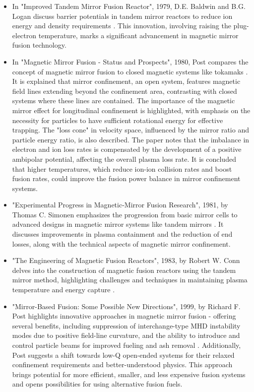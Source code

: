 \begin{itemize}
 \item In "Improved Tandem Mirror Fusion Reactor", 1979, D.E. Baldwin and B.G. Logan discuss barrier potentials in tandem mirror reactors to reduce ion energy and density requirements \cite{baldwin1979improved}. This innovation, involving raising the plug-electron temperature, marks a significant advancement in magnetic mirror fusion technology.

 \item In "Magnetic Mirror Fusion - Status and Prospects", 1980, Post compares the concept of magnetic mirror fusion to closed magnetic systems like tokamaks \cite{post1980magnetic}. It is explained that mirror confinement, an open system, features magnetic field lines extending beyond the confinement area, contrasting with closed systems where these lines are contained. The importance of the magnetic mirror effect for longitudinal confinement is highlighted, with emphasis on the necessity for particles to have sufficient rotational energy for effective trapping. The "loss cone" in velocity space, influenced by the mirror ratio and particle energy ratio, is also described. The paper notes that the imbalance in electron and ion loss rates is compensated by the development of a positive ambipolar potential, affecting the overall plasma loss rate. It is concluded that higher temperatures, which reduce ion-ion collision rates and boost fusion rates, could improve the fusion power balance in mirror confinement systems.

 \item "Experimental Progress in Magnetic-Mirror Fusion Research", 1981, by Thomas C. Simonen emphasizes the progression from basic mirror cells to advanced designs in magnetic mirror systems like tandem mirrors \cite{simonen1981experimental}. It discusses improvements in plasma containment and the reduction of end losses, along with the technical aspects of magnetic mirror confinement.

 \item "The Engineering of Magnetic Fusion Reactors", 1983, by Robert W. Conn delves into the construction of magnetic fusion reactors using the tandem mirror method, highlighting challenges and techniques in maintaining plasma temperature and energy capture \cite{conn1983engineering}.


 \item "Mirror-Based Fusion: Some Possible New Directions", 1999, by Richard F. Post highlights innovative approaches in magnetic mirror fusion - offering several benefits, including suppression of interchange-type MHD instability modes due to positive field-line curvature, and the ability to introduce and control particle beams for improved fueling and ash removal \cite{post1999mirror}. Additionally, Post suggests a shift towards low-Q open-ended systems for their relaxed confinement requirements and better-understood physics. This approach brings potential for more efficient, smaller, and less expensive fusion systems and opens possibilities for using alternative fusion fuels.
 

\end{itemize}
